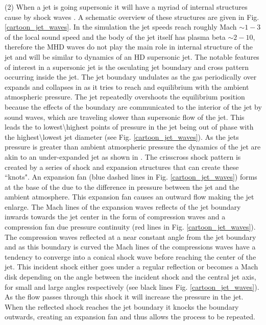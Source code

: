 \documentclass[12pt]{ociamthesis}
\begin{document}
\par (2) When a jet is going supersonic it will have a myriad of internal structures cause by shock waves \citep{Norman1982}. A schematic overview of these structures are given in Fig. \eqref{cartoon_jet_waves}. In the simulation the jet speeds reach roughly Mach $\sim 1-3$ of the local sound speed and the body of the jet itself has plasma beta $\sim 2-10$, therefore the MHD waves do not play the main role in internal structure of the jet and will be similar to dynamics of an HD supersonic jet. The notable features of interest in a supersonic jet is the osculating jet boundary and cross pattern occurring inside the jet. The jet boundary undulates as the gas periodically over expands and collapses in as it tries to reach and equilibrium with the ambient atmospheric pressure. The jet repeatedly overshoots the equilibrium position because the effects of the boundary are communicated to the interior of the jet by sound waves, which are traveling slower than supersonic flow of the jet. This leads the to lowest\textbackslash highest points of pressure in the jet being out of phase with the highest\textbackslash lowest jet diameter (see Fig. \eqref{cartoon_jet_waves}). As the jets pressure is greater than ambient atmospheric pressure the dynamics of the jet are akin to an under-expanded jet as shown in \cite{Norman1982,Edgington-Mitchell2014}. The crisscross shock pattern is created by a series of shock and expansion structures that can create these ``knots". An expansion fan (blue dashed lines in Fig. \eqref{cartoon_jet_waves}) forms at the base of the due to the difference in pressure between the jet and the ambient atmosphere. This expansion fan causes an outward flow making the jet enlarge. The Mach lines of the expansion waves reflects of the jet boundary inwards towards the jet center in the form of compression waves and a compression fan due pressure continuity (red lines in Fig. \eqref{cartoon_jet_waves}). The compression waves reflected at a near constant angle from the jet boundary and as this boundary is curved the Mach lines of the compressions waves have a tendency to converge into a conical shock wave before reaching the center of the jet. This incident shock either goes under a regular reflection or becomes a Mach disk depending on the angle between the incident shock and the central jet axis, for small and large angles respectively (see black lines Fig. \eqref{cartoon_jet_waves}). As the flow passes through this shock it will increase the pressure in the jet. When the reflected shock reaches the jet boundary it knocks the boundary outwards, creating an expansion fan and thus allows the process to be repeated.
\end{document}

